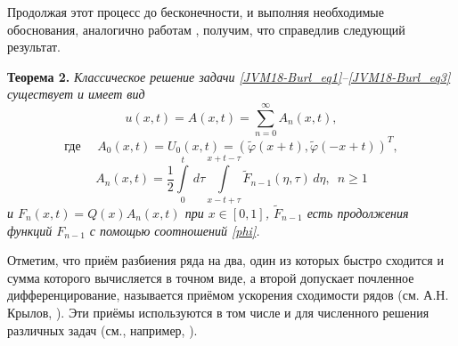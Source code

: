 Продолжая этот процесс до бесконечности, и выполняя необходимые
обоснования, аналогично работам \cite{Kh1, Kh2}, получим, что
справедлив следующий результат.

{\bf Теорема 2.} {\it Классическое решение задачи
\eqref{JVM18-Burl_eq1}--\eqref{JVM18-Burl_eq3} существует и имеет
вид
$$ u(x,t)=A(x,t)=\sum_{n=0}^{\infty}A_n(x,t),$$
$$
\text{где }\quad
A_{0}(x,t)=U_0(x,t)=(\widetilde{\varphi}(x+t),\widetilde{\varphi}(-x+t))^T,
$$
$$A_n(x,t)=\frac{1}{2} \int\limits_0^t\,d\tau\int\limits_{x-t+\tau}^{x+t-\tau}
 \widetilde{F}_{n-1}(\eta,\tau)\,d\eta,\,\,\, n\geqslant 1$$
 и $F_{n}(x,t)= Q(x)A_n(x,t)$ при $x\in[0,1]$, $\widetilde{F}_{n-1}$ есть продолжения
 функций $F_{n-1}$ с помощью соотношений \eqref{phi}.}



Отметим, что приём разбиения ряда на два, один из которых быстро
сходится и сумма которого вычисляется в точном виде, а второй
допускает почленное дифференцирование, называется приёмом ускорения
сходимости рядов (см. А.Н. Крылов, \cite{Krylov1}). Эти приёмы
используются в том числе и для численного решения различных задач
(см., например, \cite{Ch1,Ch2}).


